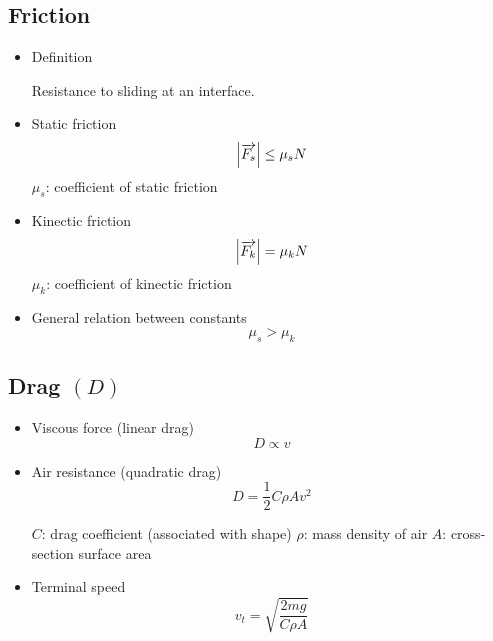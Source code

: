     \subsection{Friction}
        \begin{itemize}
            \item Definition
                \begin{center}
                    Resistance to sliding at an interface.
                \end{center}
            \item Static friction
                \begin{equation}
                    \left|\overrightarrow{F_s}\right|\leq\mu_sN
                \end{equation}
                $\mu_s$: coefficient of static friction
            \item Kinectic friction
                \begin{equation}
                    \left|\overrightarrow{F_k}\right|=\mu_kN
                \end{equation}
                $\mu_k$: coefficient of kinectic friction
            \item General relation between constants
                \begin{equation}
                    \mu_s>\mu_k
                \end{equation}
        \end{itemize}
    \subsection{Drag $(D)$}
        \begin{itemize}
            \item Viscous force (linear drag)
                \begin{equation}
                    D\propto v
                \end{equation}
            \item Air resistance (quadratic drag)
                \begin{equation}
                    D=\frac{1}{2}C\rho Av^2
                \end{equation}
                \begin{flushleft}
                    $C$: drag coefficient (associated with shape) \linebreak
                    $\rho$: mass density of air \linebreak
                    $A$: cross-section surface area
                \end{flushleft}
            \item Terminal speed
                \begin{equation}
                    v_t=\sqrt{\frac{2mg}{C\rho A}}
                \end{equation}
        \end{itemize}
